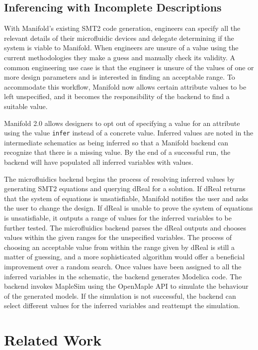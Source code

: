 \subsection{Inferencing with Incomplete Descriptions}

With Manifold's existing SMT2 code generation, engineers can specify all the
relevant details of their microfluidic devices and delegate determining if the system is viable to Manifold. When engineers
are unsure of a value using the current methodologies they make a guess and manually check its
validity. A common engineering use case is that the engineer is unsure of the
values of one or more design parameters and is interested in finding an
acceptable range. To accommodate this workflow, Manifold now allows certain
attribute values to be left unspecified, and it becomes the
responsibility of the backend to find a suitable value.

Manifold 2.0 allows designers to opt out of
specifying a value for an attribute using the value {\tt infer} instead of a
concrete value. Inferred values are noted in the intermediate schematics as
being inferred so that a Manifold backend can recognize that there is a missing value.
By the end of a successful run, the backend will have populated all inferred variables with values.

The microfluidics backend begins the process of resolving inferred values by generating SMT2 equations
and querying dReal for a solution.
If dReal returns that the system of equations is unsatisfiable, Manifold notifies the
user and asks the user to change the design. If dReal is unable to prove the system of equations is unsatisfiable,
it outputs a range of values for the inferred variables to be further tested.
The microfluidics backend parses the dReal outputs and chooses values within the given ranges for the
unspecified variables.
The process of choosing an acceptable value from within the range given by dReal is still a matter of
guessing, and a more sophisticated algorithm would offer a beneficial improvement over a random search.
Once values have been assigned to all the inferred variables in the schematic, the backend generates Modelica code.
The backend invokes MapleSim using the OpenMaple API to simulate the behaviour of the generated models.
If the simulation is not successful, the backend can select different values for the inferred variables
and reattempt the simulation.

\section{Related Work}

